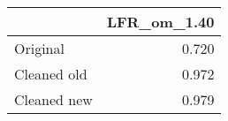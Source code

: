 \begin{tabular}{lr}
\toprule
{} & LFR_om_1.40 \\
\midrule
Original    &       0.720 \\
Cleaned old &       0.972 \\
Cleaned new &       0.979 \\
\bottomrule
\end{tabular}
